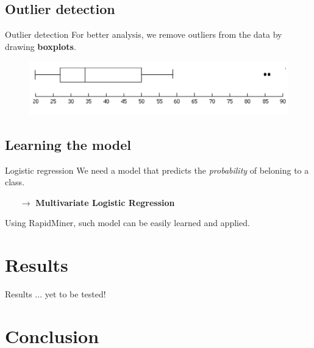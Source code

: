 \documentclass[nonav,sleutel]{beamer}
\begin{document}
\subsection{Outlier detection}
\begin{frame}{Outlier detection}
For better analysis, we remove outliers from the data by drawing \textbf{boxplots}.
\begin{figure}
	\includegraphics[scale=0.5]{images/boxplot.png}
\end{figure}
\end{frame}


\subsection{Learning the model}

\begin{frame}{Logistic regression}
We need a model that predicts the \emph{probability} of beloning to a class.\\[.5cm]
	\pause
	\begin{itemize}
		\item[$\rightarrow$] \textbf{Multivariate Logistic Regression}
	\end{itemize}
\vspace{.5cm}
Using RapidMiner, such model can be easily learned and applied. 
\end{frame}

\section{Results}

\begin{frame}{Results}
... yet to be tested!\\[.5cm]
	
\end{frame}

\section{Conclusion}
\end{document}
